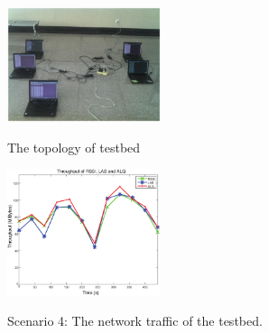 \documentclass[conference]{IEEEtran}
\def\figwidth{0.4\textwidth}
\begin{document}
  \begin{figure}[!ht]
    \centering
    \includegraphics[width=\figwidth]{topology_testbed.eps}\\\texttt{\texttt{}}
    \caption{The topology of testbed}\label{fig:topology_testbed}
  \end{figure}

  \begin{figure}
    \centering
    \includegraphics[width=\figwidth]{testbed.eps}\\
    \caption{Scenario 4: The network traffic of the testbed. }\label{fig:testbed}
  \end{figure}
\end{document}

